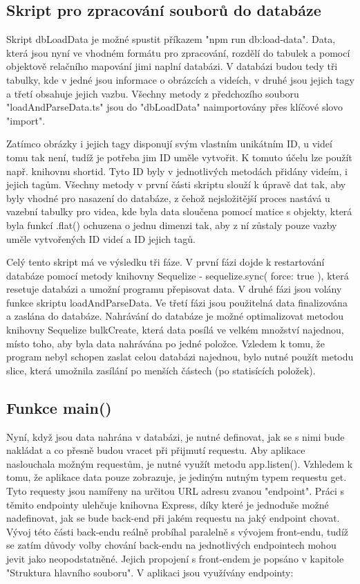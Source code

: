 \subsection{Skript pro zpracování souborů do databáze}
Skript dbLoadData je možné spustit příkazem "npm run db:load-data". Data, která jsou nyní ve vhodném formátu pro zpracování, rozdělí do tabulek a pomocí objektově relačního mapování jimi naplní databázi. V databázi budou tedy tři tabulky, kde v jedné jsou informace o obrázcích a videích, v druhé jsou jejich tagy a třetí obsahuje jejich vazbu. Všechny metody z předchozího souboru "loadAndParseData.ts" jsou do "dbLoadData" naimportovány přes klíčové slovo "import". 

Zatímco obrázky i jejich tagy disponují svým vlastním unikátním ID, u videí tomu tak není, tudíž je potřeba jim ID uměle vytvořit. K tomuto účelu lze použít např. knihovnu shortid. Tyto ID byly v jednotlivých metodách přidány videím, i jejich tagům. Všechny metody v první části skriptu slouží k úpravě dat tak, aby byly vhodné pro nasazení do databáze, z čehož nejsložitější proces nastává u vazební tabulky pro videa, kde byla data sloučena pomocí matice s objekty, která byla funkcí .flat() ochuzena o jednu dimenzi tak, aby z ní zůstaly pouze vazby uměle vytvořených  ID videí a ID jejich tagů.

Celý tento skript má ve výsledku tři fáze. V první fázi dojde k restartování databáze pomocí metody knihovny Sequelize - sequelize.sync({ force: true }), která resetuje databázi a umožní programu přepisovat data. V druhé fázi jsou volány funkce skriptu loadAndParseData. Ve třetí fázi jsou použitelná data finalizována a zaslána do databáze. Nahrávání do databáze je možné optimalizovat metodou knihovny Sequelize bulkCreate, která data posílá ve velkém množství najednou, místo toho, aby byla data nahrávána po jedné položce. Vzledem k tomu, že program nebyl schopen zaslat celou databázi najednou, bylo nutné použít metodu slice, která umožnila zasílání po menších částech (po statisících položek).

\subsection{Funkce main()}
Nyní, když jsou data nahrána v databázi, je nutné definovat, jak se s nimi bude nakládat a co přesně budou vracet při přijmutí requestu. Aby aplikace naslouchala možným requestům, je nutné využít metodu app.listen(). Vzhledem k tomu, že aplikace data pouze zobrazuje, je jediným nutným typem requestu get. Tyto requesty jsou namířeny na určitou URL adresu zvanou "endpoint". Práci s těmito endpointy ulehčuje knihovna Express, díky které je jednoduše možné nadefinovat, jak se bude back-end při jakém requestu na jaký endpoint chovat. Vývoj této části back-endu reálně probíhal paralelně s vývojem front-endu, tudíž se zatím důvody volby chování back-endu na jednotlivých endpointech mohou jevit jako neopodstatněné. Jejich propojení s front-endem je popsáno v kapitole "Struktura hlavního souboru". V aplikaci jsou využívány endpointy:

